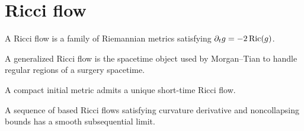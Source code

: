 \chapter{Ricci flow}

\begin{definition}
  \label{def:ricci-flow}
  A Ricci flow is a family of Riemannian metrics satisfying $\partial_t g=-2\operatorname{Ric}(g)$.
\end{definition}

\begin{definition}
  \label{def:generalized-ricci-flow}
  A generalized Ricci flow is the spacetime object used by Morgan--Tian to handle
  regular regions of a surgery spacetime.
\end{definition}

\begin{theorem}
  \label{thm:ricci-short-time-existence}
  \notready
  A compact initial metric admits a unique short-time Ricci flow.
\end{theorem}

\begin{theorem}
  \label{thm:hamilton-compactness}
  \notready
  A sequence of based Ricci flows satisfying curvature derivative and
  noncollapsing bounds has a smooth subsequential limit.
\end{theorem}
